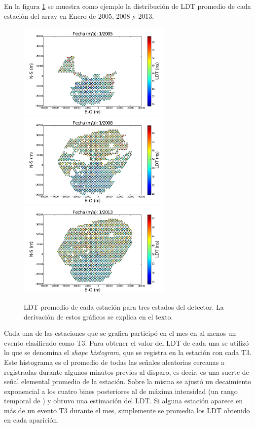	En la figura \ref{fig:ldtArray} se muestra como ejemplo la distribución de LDT promedio de cada estación del array en Enero de 2005, 2008 y 2013. 
	\begin{figure}[ht!]
		\begin{center}
			\includegraphics[width=0.67\textwidth]{fig/resultadosAuger/Out_decaytime_main_2005_01}
			\includegraphics[width=0.67\textwidth]{fig/resultadosAuger/Out_decaytime_main_2008_01} 
			\includegraphics[width=0.67\textwidth]{fig/resultadosAuger/Out_decaytime_main_2013_01}
			\caption{LDT promedio de cada estación para tres estados del detector. La derivación de estos gráficos se explica en el texto.}
			\label{fig:ldtArray}
		\end{center}
	\end{figure}
	Cada una de las estaciones que se grafica participó en el mes en al menos un evento clasificado como T3.
	Para obtener el valor del LDT de cada una se utilizó lo que se denomina el \emph{shape histogram}, que se registra en la estaci\'on con cada T3.
	Este histograma es el promedio de todas las señales aleatorias cercanas a  registradas durante algunos minutos previos al disparo, es decir, es una suerte de señal elemental promedio de la estaci\'on.
	Sobre la misma se ajustó un decaimiento exponencial a los cuatro bines posteriores al de máxima intensidad (un rango temporal de ) y obtuvo una estimación del LDT.
	Si alguna estación aparece en más de un evento T3 durante el mes, simplemente se promedia los LDT obtenido en cada aparición.
	
